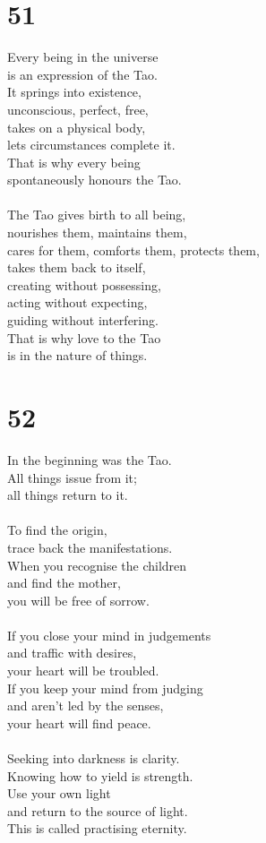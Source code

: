 \documentclass[b5paper, 12pt, oneside]{book}
\begin{document}
\chapter*{51}
Every being in the universe\\
is an expression of the Tao.\\
It springs into existence,\\
unconscious, perfect, free,\\
takes on a physical body,\\
lets circumstances complete it.\\
That is why every being\\
spontaneously honours the Tao.\\
\\
The Tao gives birth to all being,\\
nourishes them, maintains them,\\
cares for them, comforts them, protects them,\\
takes them back to itself,\\
creating without possessing,\\
acting without expecting,\\
guiding without interfering.\\
That is why love to the Tao\\
is in the nature of things.\\

\chapter*{52}
In the beginning was the Tao.\\
All things issue from it;\\
all things return to it.\\
\\
To find the origin,\\
trace back the manifestations.\\
When you recognise the children\\
and find the mother,\\
you will be free of sorrow.\\
\\
If you close your mind in judgements\\
and traffic with desires,\\
your heart will be troubled.\\
If you keep your mind from judging\\
and aren't led by the senses,\\
your heart will find peace.\\
\\
Seeking into darkness is clarity.\\
Knowing how to yield is strength.\\
Use your own light\\
and return to the source of light.\\
This is called practising eternity.
\end{document}

